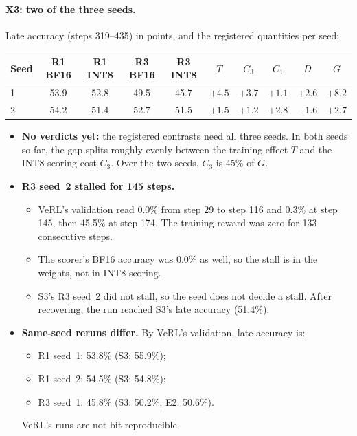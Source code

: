 \documentclass[11pt]{article}
\begin{document}
\paragraph{X3: two of the three seeds.} Late accuracy (steps 319--435) in points, and the registered quantities per seed:
\begin{center}\small
\begin{tabular}{@{}l c c c c c c c c c@{}}
\toprule
Seed & R1 BF16 & R1 INT8 & R3 BF16 & R3 INT8 & $T$ & $C_3$ & $C_1$ & $D$ & $G$\\
\midrule
1 & 53.9 & 52.8 & 49.5 & 45.7 & $+4.5$ & $+3.7$ & $+1.1$ & $+2.6$ & $+8.2$\\
2 & 54.2 & 51.4 & 52.7 & 51.5 & $+1.5$ & $+1.2$ & $+2.8$ & $-1.6$ & $+2.7$\\
\bottomrule
\end{tabular}
\end{center}
\begin{itemize}
\item \textbf{No verdicts yet:} the registered contrasts need all three seeds. In both seeds so far, the gap splits roughly evenly between the training effect $T$ and the INT8 scoring cost $C_3$. Over the two seeds, $C_3$ is 45\% of $G$.
\item \textbf{R3 seed~2 stalled for 145 steps.}
  \begin{itemize}
  \item VeRL's validation read 0.0\% from step 29 to step 116 and 0.3\% at step 145, then 45.5\% at step 174. The training reward was zero for 133 consecutive steps.
  \item The scorer's BF16 accuracy was 0.0\% as well, so the stall is in the weights, not in INT8 scoring.
  \item S3's R3 seed~2 did not stall, so the seed does not decide a stall. After recovering, the run reached S3's late accuracy (51.4\%).
  \end{itemize}
\item \textbf{Same-seed reruns differ.} By VeRL's validation, late accuracy is:
  \begin{itemize}
  \item R1 seed~1: 53.8\% (S3: 55.9\%);
  \item R1 seed~2: 54.5\% (S3: 54.8\%);
  \item R3 seed~1: 45.8\% (S3: 50.2\%; E2: 50.6\%).
  \end{itemize}
  VeRL's runs are not bit-reproducible.
\end{itemize}
\end{document}
